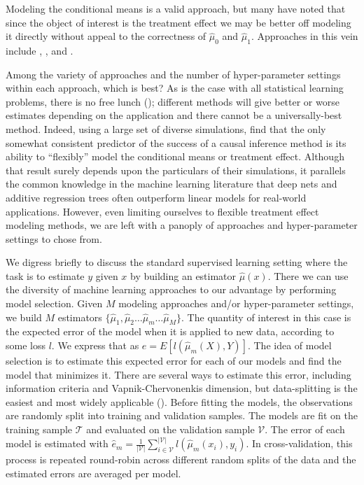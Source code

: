 Modeling the conditional means is a valid approach, but many have noted that since the object of interest is the treatment effect we may be better off modeling it directly without appeal to the correctness of $\hat\mu_0$ and $\hat\mu_1$. Approaches in this vein include \citet{Zhao:2017vi}, \citet{Athey:2016wm}, and \citet{Powers:2017wd}. 

Among the variety of approaches and the number of hyper-parameter settings within each approach, which is best? As is the case with all statistical learning problems, there is no free lunch (\citealp{Wolpert:1996fp}); different methods will give better or worse estimates depending on the application and there cannot be a universally-best method. Indeed, using a large set of diverse simulations, \citet{Dorie:2017uo} find that the only somewhat consistent predictor of the success of a causal inference method is its ability to ``flexibly'' model the conditional means or treatment effect. Although that result surely depends upon the particulars of their simulations, it parallels the common knowledge in the machine learning literature that deep nets and additive regression trees often outperform linear models for real-world applications. However, even limiting ourselves to flexible treatment effect modeling methods, we are left with a panoply of approaches and hyper-parameter settings to chose from. 

We digress briefly to discuss the standard supervised learning setting where the task is to estimate $y$ given $x$ by building an estimator $\hat{\mu}(x)$. There we can use the diversity of machine learning approaches to our advantage by performing model selection. Given $M$ modeling approaches and/or hyper-parameter settings, we build $M$ estimators $\{\hat \mu_1, \hat \mu_2 \dots \hat \mu_m \dots \hat \mu_M\}$. The quantity of interest in this case is the expected error of the model when it is applied to new data, according to some loss $l$. We express that as $e = E[l(\hat \mu_m(X), Y)]$. The idea of model selection is to estimate this expected error for each of our models and find the model that minimizes it. There are several ways to estimate this error, including information criteria and Vapnik-Chervonenkis dimension, but data-splitting is the easiest and most widely applicable (\citealp{esl:2009wc}). Before fitting the models, the observations are randomly split into training and validation samples. The models are fit on the training sample $\mathcal{T}$ and evaluated on the validation sample $\mathcal{V}$. The error of each model is estimated with $\hat e_m = \frac{1}{|\mathcal{V}|}\sum_{i \in \mathcal{V}}^{|\mathcal{V}|} l(\hat \mu_m (x_i), y_i)$. In cross-validation, this process is repeated round-robin across different random splits of the data and the estimated errors are averaged per model.

